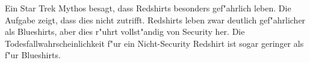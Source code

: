 \begin{diskussion}
Ein Star Trek Mythos besagt, dass Redshirts besonders gef"ahrlich
leben. Die Aufgabe zeigt, dass dies nicht zutrifft.
Redshirts leben zwar deutlich gef"ahrlicher als Blueshirts, aber
dies r"uhrt vollst"andig von Security her. Die Todesfallwahrscheinlichkeit
f"ur ein Nicht-Security Redshirt ist sogar geringer als f"ur Blueshirts.
\end{diskussion}

